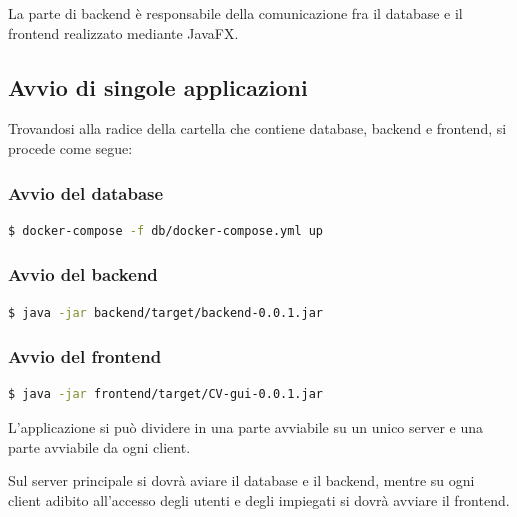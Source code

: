 \documentclass{report}
\begin{document}
  La parte di backend è responsabile della comunicazione fra il database e il frontend realizzato mediante JavaFX. 

  \subsection{Avvio di singole applicazioni}
  Trovandosi alla radice della cartella che contiene database, backend e frontend, si procede come segue:
  \subsubsection{Avvio del database}

  \begin{lstlisting}[language=bash]
  $ docker-compose -f db/docker-compose.yml up
  \end{lstlisting}    

  \subsubsection{Avvio del backend}

  \begin{lstlisting}[language=bash]
  $ java -jar backend/target/backend-0.0.1.jar
  \end{lstlisting}  

  \subsubsection{Avvio del frontend}

  \begin{lstlisting}[language=bash]
  $ java -jar frontend/target/CV-gui-0.0.1.jar
  \end{lstlisting}  


  L'applicazione si può dividere in una parte avviabile su un unico server e una parte avviabile da ogni client.

  Sul server principale si dovrà aviare il database e il backend, mentre su ogni client adibito all'accesso degli utenti e degli impiegati si dovrà avviare il frontend.
\end{document}
